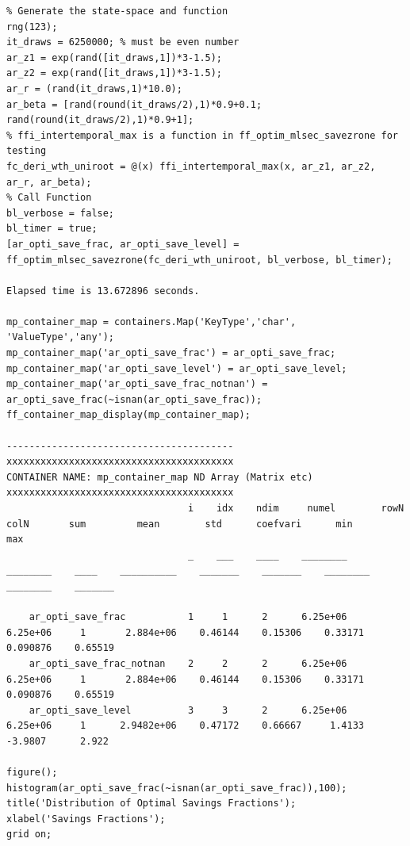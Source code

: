 \documentclass[
]{book}
\begin{document}
\begin{verbatim}
% Generate the state-space and function
rng(123);
it_draws = 6250000; % must be even number
ar_z1 = exp(rand([it_draws,1])*3-1.5);
ar_z2 = exp(rand([it_draws,1])*3-1.5);
ar_r = (rand(it_draws,1)*10.0);
ar_beta = [rand(round(it_draws/2),1)*0.9+0.1; rand(round(it_draws/2),1)*0.9+1]; 
% ffi_intertemporal_max is a function in ff_optim_mlsec_savezrone for testing
fc_deri_wth_uniroot = @(x) ffi_intertemporal_max(x, ar_z1, ar_z2, ar_r, ar_beta);
% Call Function
bl_verbose = false;
bl_timer = true;
[ar_opti_save_frac, ar_opti_save_level] = ff_optim_mlsec_savezrone(fc_deri_wth_uniroot, bl_verbose, bl_timer);

Elapsed time is 13.672896 seconds.

mp_container_map = containers.Map('KeyType','char', 'ValueType','any');
mp_container_map('ar_opti_save_frac') = ar_opti_save_frac;
mp_container_map('ar_opti_save_level') = ar_opti_save_level;
mp_container_map('ar_opti_save_frac_notnan') = ar_opti_save_frac(~isnan(ar_opti_save_frac));
ff_container_map_display(mp_container_map);

----------------------------------------
xxxxxxxxxxxxxxxxxxxxxxxxxxxxxxxxxxxxxxxx
CONTAINER NAME: mp_container_map ND Array (Matrix etc)
xxxxxxxxxxxxxxxxxxxxxxxxxxxxxxxxxxxxxxxx
                                i    idx    ndim     numel        rowN      colN       sum         mean        std      coefvari      min         max  
                                _    ___    ____    ________    ________    ____    __________    _______    _______    ________    ________    _______

    ar_opti_save_frac           1     1      2      6.25e+06    6.25e+06     1       2.884e+06    0.46144    0.15306    0.33171     0.090876    0.65519
    ar_opti_save_frac_notnan    2     2      2      6.25e+06    6.25e+06     1       2.884e+06    0.46144    0.15306    0.33171     0.090876    0.65519
    ar_opti_save_level          3     3      2      6.25e+06    6.25e+06     1      2.9482e+06    0.47172    0.66667     1.4133      -3.9807      2.922

figure();
histogram(ar_opti_save_frac(~isnan(ar_opti_save_frac)),100);
title('Distribution of Optimal Savings Fractions');
xlabel('Savings Fractions');
grid on;
\end{verbatim}
\end{document}
